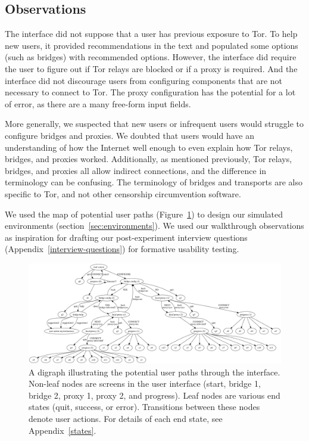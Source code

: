 \documentclass[USenglish,oneside,twocolumn]{article}
\begin{document}
\subsection{Observations}
The interface did not suppose that a user has previous exposure to Tor. To help new users, it provided recommendations in the text and populated some options (such as bridges) with recommended options. However, the interface did require the user to figure out if Tor relays are blocked or if a proxy is required. And the interface did not discourage users from configuring components that are not necessary to connect to Tor. The proxy configuration has the potential for a lot of error, as there are a many free-form input fields. 

More generally, we suspected that new users or infrequent users would struggle to configure bridges and proxies. We doubted that users would have an understanding of how the Internet well enough to even explain how Tor relays, bridges, and proxies worked. Additionally, as mentioned previously, Tor relays, bridges, and proxies all allow indirect connections, and the difference in terminology can be confusing. The terminology of bridges and transports are also specific to Tor, and not other censorship circumvention software. 

We used the map of potential user paths (Figure~\ref{fig:digraph}) to design our simulated environments (section~\ref{sec:environments}).  We used our walkthrough observations as inspiration for drafting our post-experiment interview questions (Appendix~\ref{interview-questions}) for formative usability testing. 

\begin{figure}
\centering
\includegraphics[width=\textwidth]{tor-digraph.png}
\caption{
A digraph illustrating the potential user paths through the interface. Non-leaf nodes are screens in the user interface (start, bridge 1, bridge 2, proxy 1, proxy 2, and progress). Leaf nodes are various end states (quit, success, or error). Transitions between these nodes denote user actions. For details of each end state, see Appendix~\ref{states}. 
}
\label{fig:digraph}
\end{figure} 
\end{document}
